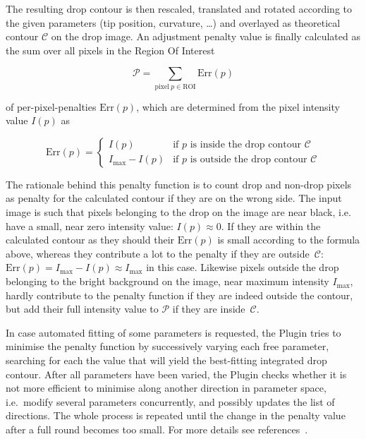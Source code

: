 \documentclass[fleqn]{scrartcl}
\begin{document}
The resulting drop contour is then rescaled, translated and rotated
according to the given parameters (tip position, curvature, \dots) and
overlayed as theoretical contour $\mathcal{C}$ on the drop image. An
adjustment penalty value is finally calculated as the sum over all
pixels in the Region Of Interest

\[
\mathcal{P} = \sum_{\mathrm{pixel}\ p \in \mathrm{ROI}} \mathrm{Err}(p)
\]

\noindent of per-pixel-penalties $\mathrm{Err}(p)$, which are
determined from the pixel intensity value $I(p)$ as

\[
\mathrm{Err}(p) = \left\{ \begin{array}{ll}
I(p) & \textrm{if } p \textrm{ is inside the drop contour } \mathcal{C} \\
I_{\mathrm{max}}-I(p) & 
\textrm{if } p \textrm{ is outside the drop contour } \mathcal{C}
\end{array} \right.
\]

The rationale behind this penalty function is to count drop and
non-drop pixels as penalty for the calculated contour if they are on
the wrong side. The input image is such that pixels belonging to the
drop on the image are near black, i.e. have a small, near zero intensity value: $I(p) \approx 0$. If they are within the calculated contour as they
should their $\mathrm{Err}(p)$ is small according to the formula
above, whereas they contribute a lot to the penalty if they are
outside~$\mathcal{C}$: $\mathrm{Err}(p) = I_{\mathrm{max}} - I(p)
\approx I_{\mathrm{max}}$ in this case. Likewise pixels outside the
drop belonging to the bright background on the image, near maximum
intensity $I_{\mathrm{max}}$, hardly contribute to the penalty
function if they are indeed outside the contour, but add their full
intensity value to $\mathcal{P}$ if they are inside~$\mathcal{C}$.

 In case
automated fitting of some parameters is requested, the Plugin tries
to minimise the penalty function by successively varying each free
parameter, searching for each the value that will yield the
best-fitting integrated drop contour. After all parameters have been
varied, the Plugin checks whether it is not more efficient to
minimise along another direction in parameter space, i.e.\ modify
several parameters concurrently, and possibly updates the list of
directions. The whole process is repeated until the change in the
penalty value after a full round becomes too small. For more details
see references~\cite{Powell1965,Brandt1992}.
\end{document}
